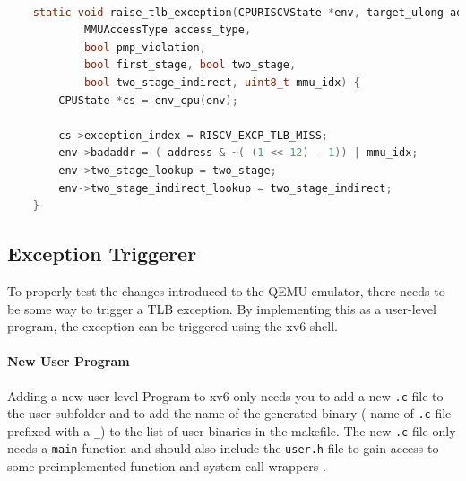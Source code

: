 \begin{lstlisting}[language=c,float=h!,basicstyle=\footnotesize,
    caption={Setup-Code for raising a TLB Exception. The \texttt{cs-\textgreater exception\_index} variable needs
    to be set to the custom \texttt{TLB Exception} enum value. The \texttt{env-\textgreater badaddr} variable
    will end up in the \texttt{mtval} register. The address will be page-aligned first, by zeroing out the
    lowest 12 bits. This is used to encode the \texttt{mmu\_idx} into the faulting address. Why this is
    necessary is explained in Section \ref{sect:tlbwrite}},
    label={lst:exceptionThrow}]

    static void raise_tlb_exception(CPURISCVState *env, target_ulong address,
            MMUAccessType access_type,
            bool pmp_violation,
            bool first_stage, bool two_stage,
            bool two_stage_indirect, uint8_t mmu_idx) {
        CPUState *cs = env_cpu(env);

        cs->exception_index = RISCV_EXCP_TLB_MISS;
        env->badaddr = ( address & ~( (1 << 12) - 1)) | mmu_idx;
        env->two_stage_lookup = two_stage;
        env->two_stage_indirect_lookup = two_stage_indirect;
    }

\end{lstlisting}



\subsection{Exception Triggerer}
To properly test the changes introduced to the QEMU emulator, there needs to be some way to
trigger a TLB exception.
By implementing this as a user-level program, the exception can be triggered using the xv6 shell.

\paragraph{New User Program} Adding a new user-level Program to xv6 only needs you to add a new \texttt{.c} file to the user subfolder
and to add the name of the generated binary ( name of \texttt{.c} file prefixed with a \texttt{\_})
to the list of user binaries in the makefile.
The new \texttt{.c} file only needs a \texttt{main} function and should also include the \texttt{user.h}
file to gain access to some preimplemented function and system call wrappers \cite{xv6source}.

